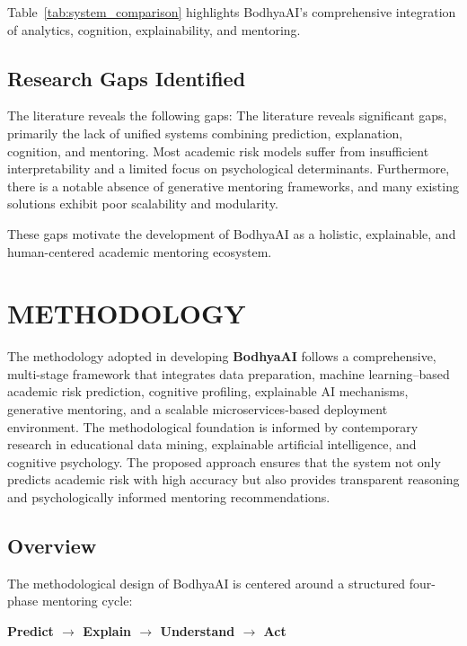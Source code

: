 \documentclass[12pt,a4paper]{report}
\begin{document}
Table~\ref{tab:system_comparison} highlights BodhyaAI’s comprehensive integration of analytics, cognition, explainability, and mentoring.


\section{Research Gaps Identified}

The literature reveals the following gaps:
The literature reveals significant gaps, primarily the lack of unified systems combining prediction, explanation, cognition, and mentoring. Most academic risk models suffer from insufficient interpretability and a limited focus on psychological determinants. Furthermore, there is a notable absence of generative mentoring frameworks, and many existing solutions exhibit poor scalability and modularity.

These gaps motivate the development of BodhyaAI as a holistic, explainable, and human-centered academic mentoring ecosystem.



\chapter{METHODOLOGY}\label{Methodology}

The methodology adopted in developing \textbf{BodhyaAI} follows a comprehensive, multi-stage framework that integrates data preparation, machine learning–based academic risk prediction, cognitive profiling, explainable AI mechanisms, generative mentoring, and a scalable microservices-based deployment environment. The methodological foundation is informed by contemporary research in educational data mining, explainable artificial intelligence, and cognitive psychology. The proposed approach ensures that the system not only predicts academic risk with high accuracy but also provides transparent reasoning and psychologically informed mentoring recommendations.

\section{Overview}

The methodological design of BodhyaAI is centered around a structured four-phase mentoring cycle:

\begin{center}
\textbf{Predict $\rightarrow$ Explain $\rightarrow$ Understand $\rightarrow$ Act}
\end{center}
\end{document}
